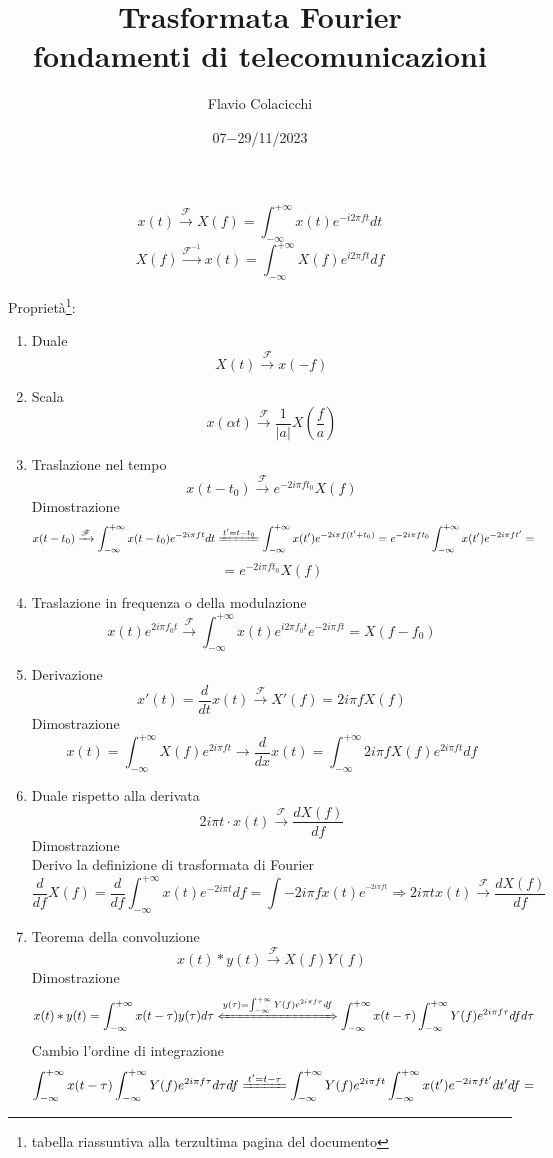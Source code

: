 \documentclass{article}
\title{Trasformata Fourier\\\normalsize fondamenti di telecomunicazioni}
\author{Flavio Colacicchi}
\date{07$-$29/11/2023}
\newcommand{\trasformata}{\xrightarrow{\mathscr{F}}}
\newcommand{\antitrasformata}{\xrightarrow{\mathscr{F}^{-1}}}
\begin{document}
\maketitle
\begin{center}
\LARGE\[x(t)\trasformata X(f)=\int_{-\infty}^{+\infty}x(t) e^{-i2\pi ft}dt\]
\[X(f)\antitrasformata x(t)=\int_{-\infty}^{+\infty}X(f) e^{i2\pi ft}df\]
\end{center}
Proprietà\footnote{tabella riassuntiva alla terzultima pagina del documento}:
\begin{enumerate}
    \item Duale
        \[X(t)\trasformata x(-f)\]
    \item Scala
        \[x(\alpha t)\trasformata\frac{1}{|a|}X\left(\frac{f}{a}\right)\]
    \item Traslazione nel tempo
        \[x(t-t_0)\trasformata e^{-2i\pi f t_0}X(f)\]
        Dimostrazione
        \[x(t-t_0)\trasformata \int_{-\infty}^{+\infty}x(t-t_0)e^{-2i\pi ft}dt\xlongequal{t'=t-t_0}\int_{-\infty}^{+\infty}x(t')e^{-2i\pi f(t'+t_0)}=e^{-2i\pi f t_0}\int_{-\infty}^{+\infty}x(t')e^{-2i\pi ft'}=\]
        \[=e^{-2i\pi f t_0}X(f)\]
    \item Traslazione in frequenza o della modulazione
        \[x(t)e^{2i\pi f_0 t}\trasformata \int_{-\infty}^{+\infty}x(t)e^{i2\pi f_0 t}e^{-2i\pi ft}=X(f-f_0)\]
    \item Derivazione
        \[x'(t)=\frac{d}{dt}x(t)\trasformata X'(f)=2i\pi fX(f)\]
        Dimostrazione
        \[x(t)=\int_{-\infty}^{+\infty}X(f)e^{2i\pi ft}\rightarrow\frac{d}{dx}x(t)=\int_{-\infty}^{+\infty}2i\pi fX(f)e^{2i\pi ft}df\]
    \item Duale rispetto alla derivata
        \[2i\pi t\cdot x(t)\trasformata\frac{dX(f)}{df}\]
        Dimostrazione\\
        Derivo la definizione di trasformata di Fourier
        \[\frac{d}{df}X(f)=\frac{d}{df}\int_{-\infty}^{+\infty}x(t)e^{-2i\pi t}df=\int-2i\pi f x(t)e^{^{-2i\pi ft}}\Rightarrow 2i\pi tx(t)\trasformata\frac{dX(f)}{df}\]
    \item Teorema della convoluzione
        \[x(t)*y(t)\trasformata X(f)Y(f)\]
        Dimostrazione
        \[x(t)*y(t)=\int_{-\infty}^{+\infty}x(t-\tau)y(\tau)d\tau\xLeftrightarrow{y(\tau)=\int_{-\infty}^{+\infty}Y(f)e^{2i\pi f\tau}df}\int_{-\infty}^{+\infty}x(t-\tau)\int_{-\infty}^{+\infty}Y(f)e^{2i\pi f\tau}dfd\tau\]
        Cambio l'ordine di integrazione
        \[\int_{-\infty}^{+\infty}x(t-\tau)\int_{-\infty}^{+\infty}Y(f)e^{2i\pi f\tau}d\tau df\xlongequal{t'=t-\tau}\int_{-\infty}^{+\infty}Y(f)e^{2i\pi ft}\int_{-\infty}^{+\infty}x(t')e^{-2i\pi ft'}dt'df=\]

\end{enumerate}
\end{document}
